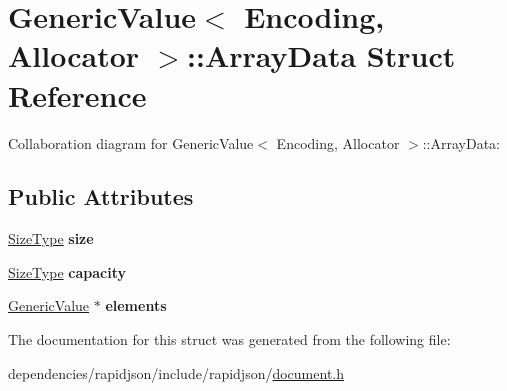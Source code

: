 \hypertarget{struct_generic_value_1_1_array_data}{}\section{Generic\+Value$<$ Encoding, Allocator $>$\+:\+:Array\+Data Struct Reference}
\label{struct_generic_value_1_1_array_data}


Collaboration diagram for Generic\+Value$<$ Encoding, Allocator $>$\+:\+:Array\+Data\+:
\subsection*{Public Attributes}
\begin{DoxyCompactItemize}
\item 
\mbox{\label{struct_generic_value_1_1_array_data_a5306856f64aea8ec53abf263ed2a35e2}} 
\hyperlink{rapidjson_8h_a5ed6e6e67250fadbd041127e6386dcb5}{Size\+Type} {\bfseries size}
\item 
\mbox{\label{struct_generic_value_1_1_array_data_a0c6fe03c00e13d14b95abd31048aa1f5}} 
\hyperlink{rapidjson_8h_a5ed6e6e67250fadbd041127e6386dcb5}{Size\+Type} {\bfseries capacity}
\item 
\mbox{\label{struct_generic_value_1_1_array_data_a86df976cb6f65924aca20eb9bd35553e}} 
\hyperlink{class_generic_value}{Generic\+Value} $\ast$ {\bfseries elements}
\end{DoxyCompactItemize}


The documentation for this struct was generated from the following file\+:\begin{DoxyCompactItemize}
\item 
dependencies/rapidjson/include/rapidjson/\hyperlink{document_8h}{document.\+h}\end{DoxyCompactItemize}
